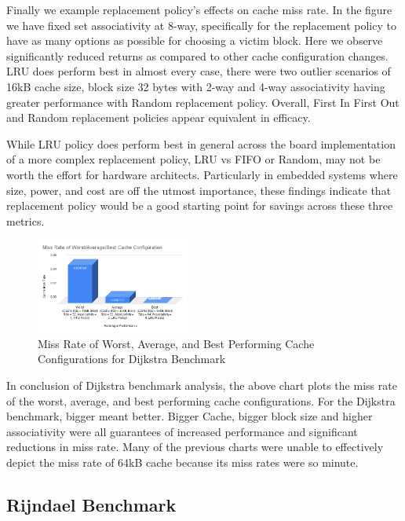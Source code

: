 \documentclass[conference]{IEEEtran}
\begin{document}
Finally we example replacement policy's effects on cache miss rate. In the figure we have fixed set associativity at 8-way, specifically for the replacement policy to have as many options as possible for choosing a victim block. Here we observe significantly reduced returns as compared to other cache configuration changes. LRU does perform best in almost every case, there were two outlier scenarios of 16kB cache size, block size 32 bytes with 2-way and 4-way associativity having greater performance with Random replacement policy. Overall, First In First Out and Random replacement policies appear equivalent in efficacy. 

While LRU policy does perform best in general across the board implementation of a more complex replacement policy, LRU vs FIFO or Random, may not be worth the effort for hardware architects. Particularly in embedded systems where size, power, and cost are off the utmost importance, these findings indicate that replacement policy would be a good starting point for savings across these three metrics.

\begin{figure}[H]
  \centering
  \includegraphics[width=0.45\textwidth]{dijkstraFigures/MissRateofWorstAverageBestCacheConfiguration.png}
  \caption{Miss Rate of Worst, Average, and Best Performing Cache Configurations for Dijkstra Benchmark}
  \label{fig:WorstAvgBest}
\end{figure}

In conclusion of Dijkstra benchmark analysis, the above chart plots the miss rate of the worst, average, and best performing cache configurations. For the Dijkstra benchmark, bigger meant better. Bigger Cache, bigger block size and higher associativity were all guarantees of increased performance and significant reductions in miss rate. Many of the previous charts were unable to effectively depict the miss rate of 64kB cache because its miss rates were so minute.

\subsection{Rijndael Benchmark}
\end{document}
